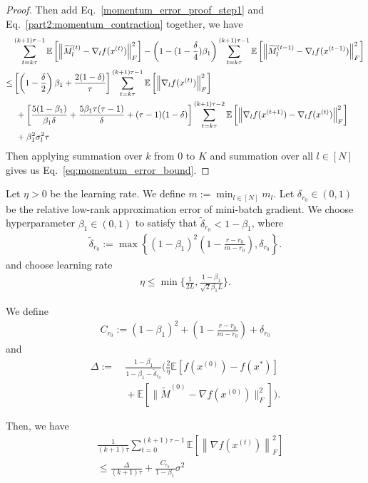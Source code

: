 \begin{proof}
Then add Eq.~\eqref{momentum_error_proof_step1} and Eq.~\eqref{part2:momentum_contraction} together, we have
\begin{align}\label{momentum_error_proof_step2}
&\sum_{t = k\tau}^{(k+1)\tau-1}\mathbb{E}\left [ \left \| \tilde{M}_l^{(t)}-\nabla_l f(x^{(t)}) \right \|_F^2  \right ] -\left(1-(1-\frac{\delta}{4})\beta_1\right)\sum_{t = k\tau}^{(k+1)\tau-1}\mathbb{E}\left [ \left \| \tilde{M}_l^{(t-1)}-\nabla_l f(x^{(t-1)}) \right \|_F^2  \right ]\notag\\
\leq & \left[\left(1-\frac{\delta}{2}\right)\beta_1+\frac{2(1-\delta)}{\tau}\right]\sum_{t = k\tau}^{(k+1)\tau-1}\mathbb{E}\left [ \left \|\nabla_l f(x^{(t)}) \right \|_F^2  \right ] \notag\\
&~+\left[\frac{5(1-\beta_1)}{\beta_1\delta}+\frac{5\beta_1 \tau(\tau-1)}{\delta}+(\tau-1)(1-\delta)\right]\sum_{t = k\tau}^{(k+1)\tau-2}\mathbb{E}\left [ \left \|\nabla_l f(x^{(t+1)})-\nabla_l f(x^{(t)}) \right \|_F^2  \right ]\notag\\
&~+\beta_1^2\sigma_l^2\tau\notag\\
\end{align}
Then applying summation over $k$ from 0 to $K$ and summation over all $l\in [N]$ gives us Eq.~\eqref{eq:momentum_error_bound}.
\end{proof}


\begin{theorem}
Let $\eta > 0$ be the learning rate.
We define $m := \min_{l \in [N]} m_l$.
Let $\delta_{r_0} \in (0, 1)$ be the relative low-rank approximation error of mini-batch gradient. We choose hyperparameter $\beta_1 \in (0, 1)$ to satisfy that $\tilde{\delta}_{r_0} < 1-\beta_1$, where
\begin{align*}
\tilde{\delta}_{r_0} := \max \left \{ \left(1-\beta_1\right)^2\left(1-\frac{r-r_0}{m-r_0} \right), \delta _{r_0} \right \}.
\end{align*}
and choose learning rate 
\begin{align*}
    \eta \leq \min\{\frac{1}{2L}, \frac{1-\beta_1}{\sqrt{2}\beta_1L}\}.
\end{align*}

We define 
\begin{align*}
    C_{r_0} := (1-\beta_1)^2+(1-\frac{r-r_0}{m-r_0}) + \delta_{r_0}
\end{align*}
and
\begin{align*}
    \Delta 
    := & ~ \frac{1-\beta_1}{1-\beta_1-\tilde{\delta}_{r_0}}(\frac{2}{\eta}\mathbb{E} [ f(x^{(0)}) - f(x^*)] \\
    & ~ + \mathbb{E}[ \| \tilde{M}^{(0)}-\nabla f(x^{(0)}) \|_F^2  ]).
\end{align*}

Then, we have
\begin{align*}
& ~ \frac{1}{(k+1)\tau}\sum_{t=0}^{(k+1)\tau-1}\mathbb{E}\left [ \left \| \nabla f(x^{(t)})  \right \| _F^2 \right ] \\
& ~ \leq \frac{\Delta}{(k+1)\tau}+ \frac{C_{r_0}}{1-\beta_1}\sigma^2
\end{align*}
\end{theorem}

